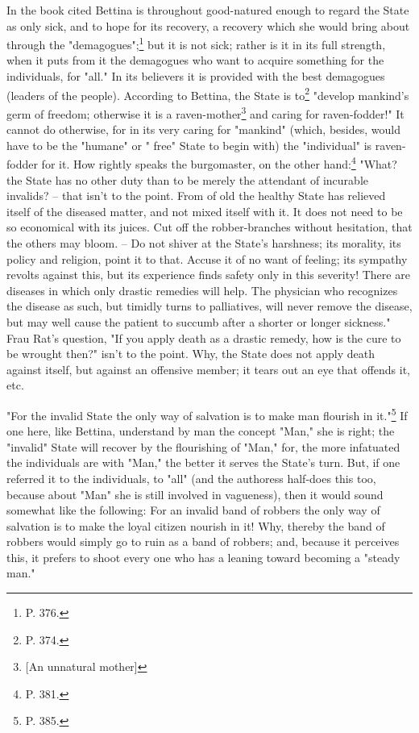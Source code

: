 In the book cited Bettina is throughout good-natured enough to regard the 
State as only sick, and to hope for its recovery, a recovery which she would 
bring about through the "{}demagogues"{};\footnote{P. 376.} but it is not 
sick; rather is it in its full strength, when it puts from it the demagogues 
who want to acquire something for the individuals, for "{}all."{} In its 
believers it is provided with the best demagogues (leaders of the people). 
According to Bettina, the State is to\footnote{P. 374.} "{}develop mankind's 
germ of freedom; otherwise it is a raven-mother\footnote{[An unnatural 
mother]} and caring for raven-fodder!"{} It cannot do otherwise, for in its 
very caring for "{}mankind"{} (which, besides, would have to be the 
"{}humane"{} or "{} free"{} State to begin with) the "{}individual"{} is 
raven-fodder for it. How rightly speaks the burgomaster, on the other 
hand:\footnote{P. 381.} "{}What? the State has no other duty than to be merely 
the attendant of incurable invalids? -- that isn't to the point. From of old 
the healthy State has relieved itself of the diseased matter, and not mixed 
itself with it. It does not need to be so economical with its juices. Cut off 
the robber-branches without hesitation, that the others may bloom. -- Do not 
shiver at the State's harshness; its morality, its policy and religion, point 
it to that. Accuse it of no want of feeling; its sympathy revolts against 
this, but its experience finds safety only in this severity! There are 
diseases in which only drastic remedies will help. The physician who 
recognizes the disease as such, but timidly turns to palliatives, will never 
remove the disease, but may well cause the patient to succumb after a shorter 
or longer sickness."{} Frau Rat's question, "{}If you apply death as a drastic 
remedy, how is the cure to be wrought then?"{} isn't to the point. Why, the 
State does not apply death against itself, but against an offensive member; it 
tears out an eye that offends it, etc.

"{}For the invalid State the only way of salvation is to make man flourish in 
it."{}\footnote{P. 385.} If one here, like Bettina, understand by man the 
concept "{}Man,"{} she is right; the "{}invalid"{} State will recover by the 
flourishing of "{}Man,"{} for, the more infatuated the individuals are with 
"{}Man,"{} the better it serves the State's turn. But, if one referred it to 
the individuals, to "{}all"{} (and the authoress half-does this too, because 
about "{}Man"{} she is still involved in vagueness), then it would sound 
somewhat like the following: For an invalid band of robbers the only way of 
salvation is to make the loyal citizen nourish in it! Why, thereby the band of 
robbers would simply go to ruin as a band of robbers; and, because it 
perceives this, it prefers to shoot every one who has a leaning toward 
becoming a "{}steady man."{}

